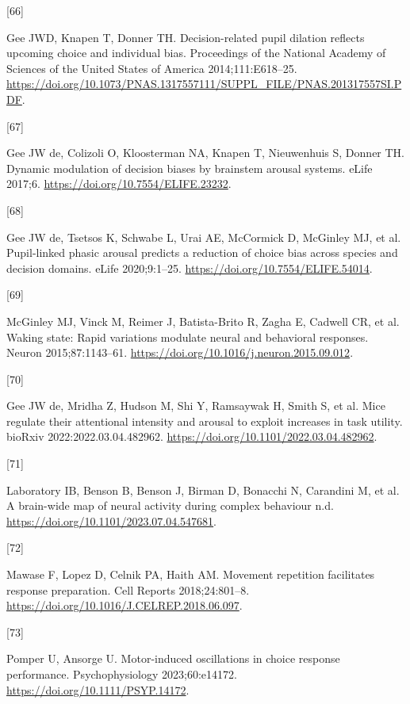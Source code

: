 \documentclass[
]{article}
\newlength{\cslhangindent}
\newlength{\csllabelwidth}
\newlength{\cslentryspacingunit} %
\newenvironment{CSLReferences}[2] %
 {%
  \setlength{\parindent}{0pt}
  \ifodd #1
  \let\oldpar\par
  \def\par{\hangindent=\cslhangindent\oldpar}
  \fi
  \setlength{\parskip}{#2\cslentryspacingunit}
 }%
 {}
\newcommand{\CSLLeftMargin}[1]{\parbox[t]{\csllabelwidth}{#1}}
\newcommand{\CSLRightInline}[1]{\parbox[t]{\linewidth - \csllabelwidth}{#1}\break}
\begin{document}
\begin{CSLReferences}{0}{0}
\leavevmode{}%
\CSLLeftMargin{{[}66{]} }%
\CSLRightInline{Gee JWD, Knapen T, Donner TH. Decision-related pupil
dilation reflects upcoming choice and individual bias. Proceedings of
the National Academy of Sciences of the United States of America
2014;111:E618--25.
\url{https://doi.org/10.1073/PNAS.1317557111/SUPPL_FILE/PNAS.201317557SI.PDF}.}

\leavevmode{}%
\CSLLeftMargin{{[}67{]} }%
\CSLRightInline{Gee JW de, Colizoli O, Kloosterman NA, Knapen T,
Nieuwenhuis S, Donner TH. Dynamic modulation of decision biases by
brainstem arousal systems. eLife 2017;6.
\url{https://doi.org/10.7554/ELIFE.23232}.}

\leavevmode{}%
\CSLLeftMargin{{[}68{]} }%
\CSLRightInline{Gee JW de, Tsetsos K, Schwabe L, Urai AE, McCormick D,
McGinley MJ, et al. Pupil-linked phasic arousal predicts a reduction of
choice bias across species and decision domains. eLife 2020;9:1--25.
\url{https://doi.org/10.7554/ELIFE.54014}.}

\leavevmode{}%
\CSLLeftMargin{{[}69{]} }%
\CSLRightInline{McGinley MJ, Vinck M, Reimer J, Batista-Brito R, Zagha
E, Cadwell CR, et al. Waking state: Rapid variations modulate neural and
behavioral responses. Neuron 2015;87:1143--61.
\url{https://doi.org/10.1016/j.neuron.2015.09.012}.}

\leavevmode{}%
\CSLLeftMargin{{[}70{]} }%
\CSLRightInline{Gee JW de, Mridha Z, Hudson M, Shi Y, Ramsaywak H, Smith
S, et al. Mice regulate their attentional intensity and arousal to
exploit increases in task utility. bioRxiv 2022:2022.03.04.482962.
\url{https://doi.org/10.1101/2022.03.04.482962}.}

\leavevmode{}%
\CSLLeftMargin{{[}71{]} }%
\CSLRightInline{Laboratory IB, Benson B, Benson J, Birman D, Bonacchi N,
Carandini M, et al. A brain-wide map of neural activity during complex
behaviour n.d. \url{https://doi.org/10.1101/2023.07.04.547681}.}

\leavevmode{}%
\CSLLeftMargin{{[}72{]} }%
\CSLRightInline{Mawase F, Lopez D, Celnik PA, Haith AM. Movement
repetition facilitates response preparation. Cell Reports
2018;24:801--8. \url{https://doi.org/10.1016/J.CELREP.2018.06.097}.}

\leavevmode{}%
\CSLLeftMargin{{[}73{]} }%
\CSLRightInline{Pomper U, Ansorge U. Motor-induced oscillations in
choice response performance. Psychophysiology 2023;60:e14172.
\url{https://doi.org/10.1111/PSYP.14172}.}


\end{CSLReferences}
\end{document}
